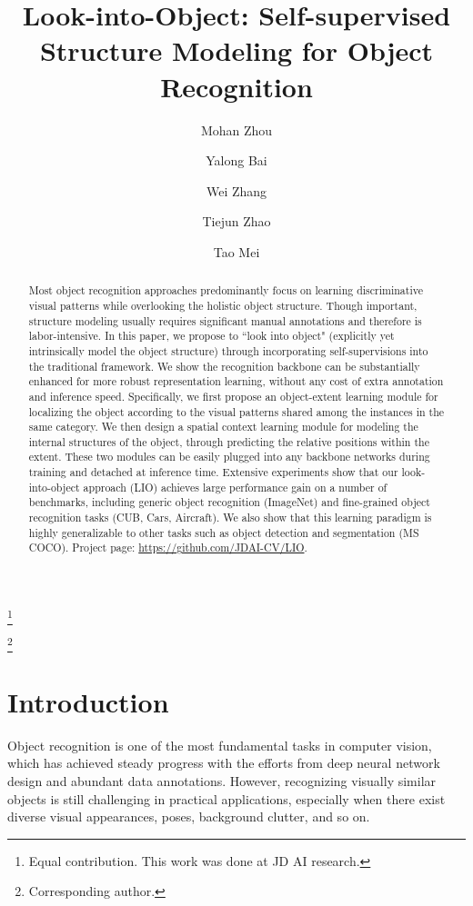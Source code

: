 \documentclass[10pt,twocolumn,letterpaper]{article}
\begin{document}
\title{Look-into-Object: Self-supervised Structure Modeling for Object Recognition}
\renewcommand\Affilfont{\normalsize }
\author[1,2*]{Mohan Zhou}
\author[2*]{Yalong Bai}
\author[2]{Wei Zhang}
\author[1]{Tiejun Zhao}
\author[2]{Tao Mei}
 

\newcommand\blfootnote[1]{\begingroup 
\renewcommand\thefootnote{}\footnote{#1}\addtocounter{footnote}{-1}\endgroup 
}

\maketitle

\begin{abstract}
    Most object recognition approaches predominantly focus on learning discriminative visual patterns while overlooking the holistic object structure. Though important, structure modeling usually requires significant manual annotations and therefore is labor-intensive. In this paper, we propose to ``look into object" (explicitly yet intrinsically model the object structure) through incorporating self-supervisions into the traditional framework. We show the recognition backbone can be substantially enhanced for more robust representation learning, without any cost of extra annotation and inference speed.  Specifically, we first propose an object-extent learning module for localizing the object according to the visual patterns shared among the instances in the same category. We then design a spatial context learning module for modeling the internal structures of the object, through predicting the relative positions within the extent. These two modules can be easily plugged into any backbone networks during training and detached at inference time. Extensive experiments show that our look-into-object approach (LIO) achieves large performance gain on a number of benchmarks, including generic object recognition (ImageNet) and fine-grained object recognition tasks (CUB, Cars, Aircraft). We also show that this learning paradigm is highly generalizable to other tasks such as object detection and segmentation (MS COCO). Project page: \url{https://github.com/JDAI-CV/LIO}.
\end{abstract}    
\blfootnote{Equal contribution. This work was done at JD AI research.}
\blfootnote{Corresponding author.}
\section{Introduction} \label{sec:introduction}
Object recognition is one of the most fundamental tasks in computer vision, which has achieved steady progress with the efforts from deep neural network design and abundant data annotations. However, recognizing visually similar objects is still challenging in practical applications, especially when there exist diverse visual appearances, poses, background clutter, and so on.	
\end{document}
